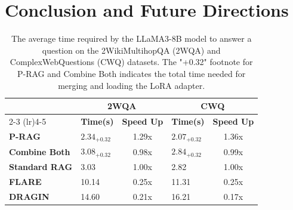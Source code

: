 \documentclass[sigconf,natbib=true,anonymous=false]{acmart}
\begin{document}
\section{Conclusion and Future Directions}
\begin{table}
\caption{The average time required by the LLaMA3-8B model to answer a question on the 2WikiMultihopQA (2WQA) and ComplexWebQuestions (CWQ) datasets. The "+0.32" footnote for P-RAG and Combine Both indicates the total time needed for merging and loading the LoRA adapter.}
\label{tab:time}
\centering
\setlength\tabcolsep{3.6pt}
\begin{tabular}{llclc}
\toprule
                      & \multicolumn{2}{c}{\textbf{2WQA}}                                              & \multicolumn{2}{c}{\textbf{CWQ}}                                                \\
                      \cmidrule(lr){2-3} \cmidrule(lr){4-5} 
                      & \multicolumn{1}{c}{\textbf{Time(s)}} & \multicolumn{1}{c}{\textbf{Speed Up}} & \multicolumn{1}{c}{\textbf{Time(s)}} & \multicolumn{1}{c}{\textbf{Speed Up}}  \\
                      \toprule
                
\textbf{P-RAG}        & ${2.34}_{+0.32}$                              & 1.29x                              & ${2.07}_{+0.32}$                              & 1.36x                               \\
\textbf{Combine Both}      & ${3.08}_{+0.32}$                              & 0.98x                              & ${2.84}_{+0.32}$                             & 0.99x                               \\

\textbf{Standard RAG} & 3.03                                      & 1.00x                                 & 2.82                                      & 1.00x                                  \\
\textbf{FLARE}        & 10.14                                     & 0.25x                              & 11.31                                      & 0.25x\\
\textbf{DRAGIN}       & 14.60                                     & 0.21x                              & 16.21                                     & 0.17x\\   
\toprule
\end{tabular}
\end{table}
\end{document}
